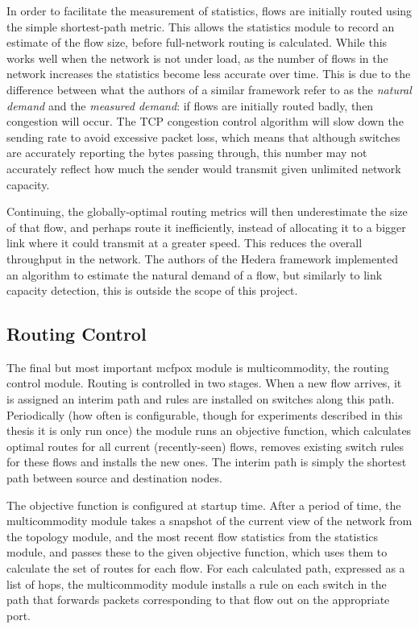 In order to facilitate the measurement of statistics, flows are initially routed using the simple shortest-path metric. This allows the statistics module to record an estimate of the flow size, before full-network routing is calculated. While this works well when the network is not under load, as the number of flows in the network increases the statistics become less accurate over time. This is due to the difference between what the authors of a similar framework \cite{alfares:hedera} refer to as the \emph{natural demand} and the \emph{measured demand}: if flows are initially routed badly, then congestion will occur. The TCP congestion control algorithm will slow down the sending rate to avoid excessive packet loss, which means that although switches are accurately reporting the bytes passing through, this number may not accurately reflect how much the sender would transmit given unlimited network capacity. 

Continuing, the globally-optimal routing metrics will then underestimate the size of that flow, and perhaps route it inefficiently, instead of allocating it to a bigger link where it could transmit at a greater speed. This reduces the overall throughput in the network. The authors of the Hedera framework \cite{alfares:hedera} implemented an algorithm to estimate the natural demand of a flow, but similarly to link capacity detection, this is outside the scope of this project.

\subsection{Routing Control}
The final but most important mcfpox module is multicommodity, the routing control module. Routing is controlled in two stages. When a new flow arrives, it is assigned an interim path and rules are installed on switches along this path. Periodically (how often is configurable, though for experiments described in this thesis it is only run once) the module runs an objective function, which calculates optimal routes for all current (recently-seen) flows, removes existing switch rules for these flows and installs the new ones. The interim path is simply the shortest path between source and destination nodes.

The objective function is configured at startup time. After a period of time, the multicommodity module takes a snapshot of the current view of the network from the topology module, and the most recent flow statistics from the statistics module, and passes these to the given objective function, which uses them to calculate the set of routes for each flow. For each calculated path, expressed as a list of hops, the multicommodity module installs a rule on each switch in the path that forwards packets corresponding to that flow out on the appropriate port.

